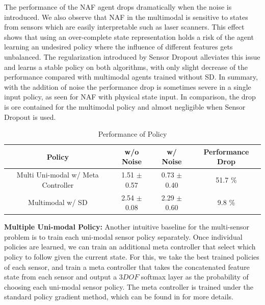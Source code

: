 \documentclass[../thesis.tex]{subfiles}
\begin{document}
The performance of the NAF agent drops dramatically when the noise is introduced. We also observe that NAF in the multimodal is sensitive to states from sensors which are easily interpretable such as laser scanners. This effect shows that using an over-complete state representation holds a risk of the agent learning an undesired policy where the influence of different features gets unbalanced. The regularization introduced by Sensor Dropout alleviates this issue and learns a stable policy on both algorithms, with only slight decrease of the performance compared with multimodal agents trained without SD. In summary, with the addition of noise the performance drop is sometimes severe in a single input policy, as seen for NAF with physical state input. In comparison, the drop is ore contained for the multimodal policy and almost negligible when Sensor Dropout is used.


\begin{table}[t]
    \vskip 0.1in
    \caption{Performance of Policy }
    \label{table:multiple-uni-baseline}
    \vskip 0.1in
    \centering
    \begin{small}
    \begin{sc}
    \begin{tabular}{c|cc|c}
    \toprule 
    \centering
    Policy & w/o Noise & w/ Noise & Performance Drop \\ \midrule \midrule
     Multi Uni-modal w/ Meta Controller & 1.51 $\pm$ 0.57 & 0.73 $\pm$ 0.40 & 51.7 \% \\
     Multimodal w/ SD & 2.54 $\pm$ 0.08 & 2.29 $\pm$ 0.60 & 9.8 \% \\ \toprule
    \end{tabular}
    \end{sc}
    \end{small}
\end{table}

\textbf{Multiple Uni-modal Policy:}
Another intuitive baseline for the multi-sensor problem is to train each uni-modal sensor policy separately. Once individual policies are learned, we can train an additional meta controller that select which policy to follow given the current state.
For this, we take the best trained policies of each sensor, and train a meta controller that takes the concatenated feature state from each sensor and output a $3 DOF$ softmax layer as the probability of choosing each uni-modal sensor policy. The meta controller is trained under the standard policy gradient method, which can be found in \cite{meta_policy} for more details.
\end{document}
